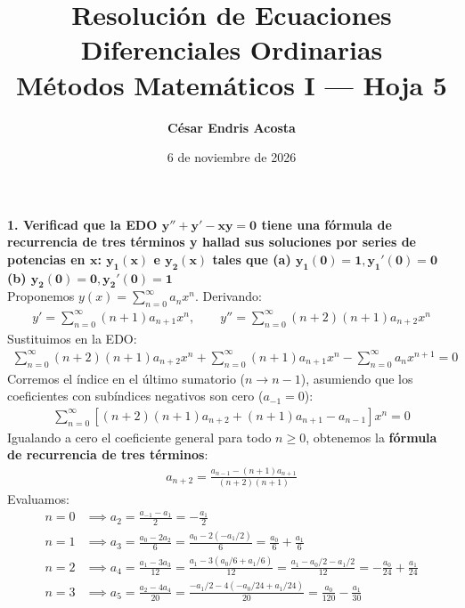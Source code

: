 \documentclass[11pt, a4paper]{article}
\title{\vspace{-1.5cm}\textbf{Resolución de Ecuaciones Diferenciales Ordinarias}\\ \large Métodos Matemáticos I --- Hoja 5}
\author{\textbf{César Endris Acosta}}
\date{6 de noviembre de 2026}
\begin{document}
\maketitle
\vspace{-0.2cm}

\begin{center}
\end{center}

\noindent\textbf{1. Verificad que la EDO $\bm{y''+y'-xy=0}$ tiene una fórmula de recurrencia de tres términos y hallad sus soluciones por series de potencias en $\bm{x}$: $\bm{y_1(x)}$ e $\bm{y_2(x)}$ tales que (a) $\bm{y_1(0)=1, y_1'(0)=0}$ (b) $\bm{y_2(0)=0, y_2'(0)=1}$} \\

Proponemos $y(x) = \sum_{n=0}^{\infty} a_n x^n$. Derivando:
\begin{align*}
y' = \sum_{n=0}^{\infty} (n+1)a_{n+1} x^n, \qquad y'' = \sum_{n=0}^{\infty} (n+2)(n+1)a_{n+2} x^n
\end{align*}
Sustituimos en la EDO:
\begin{align*}
\sum_{n=0}^{\infty} (n+2)(n+1)a_{n+2} x^n + \sum_{n=0}^{\infty} (n+1)a_{n+1} x^n - \sum_{n=0}^{\infty} a_n x^{n+1} = 0
\end{align*}
Corremos el índice en el último sumatorio ($n \to n-1$), asumiendo que los coeficientes con subíndices negativos son cero ($a_{-1} = 0$):
\begin{align*}
\sum_{n=0}^{\infty} \left[ (n+2)(n+1)a_{n+2} + (n+1)a_{n+1} - a_{n-1} \right] x^n = 0
\end{align*}
Igualando a cero el coeficiente general para todo $n \geq 0$, obtenemos la \textbf{fórmula de recurrencia de tres términos}:
\begin{align*}
a_{n+2} = \frac{a_{n-1} - (n+1)a_{n+1}}{(n+2)(n+1)}
\end{align*}
Evaluamos:
\begin{align*}
n=0 &\implies a_2 = \frac{a_{-1} - a_1}{2} = -\frac{a_1}{2} \\
n=1 &\implies a_3 = \frac{a_0 - 2a_2}{6} = \frac{a_0 - 2(-a_1/2)}{6} = \frac{a_0}{6} + \frac{a_1}{6} \\
n=2 &\implies a_4 = \frac{a_1 - 3a_3}{12} = \frac{a_1 - 3(a_0/6 + a_1/6)}{12} = \frac{a_1 - a_0/2 - a_1/2}{12} = -\frac{a_0}{24} + \frac{a_1}{24} \\
n=3 &\implies a_5 = \frac{a_2 - 4a_4}{20} = \frac{-a_1/2 - 4(-a_0/24 + a_1/24)}{20} = \frac{a_0}{120} - \frac{a_1}{30}
\end{align*}
\end{document}
